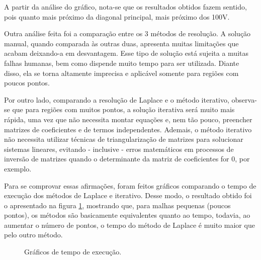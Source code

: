 \documentclass[a4paper,11pt]{article}
\begin{document}
    A partir da análise do gráfico, nota-se que os resultados obtidos fazem sentido, pois quanto mais próximo da diagonal principal, mais próximo dos 100V.
    
    Outra análise feita foi a comparação entre os 3 métodos de resolução. A solução manual, quando comparada às outras duas, apresenta muitas limitações que acabam deixando-a em desvantagem. Esse tipo de solução está sujeita a muitas falhas humanas, bem como dispende muito tempo para ser utilizada. Diante disso, ela se torna altamente imprecisa e aplicável somente para regiões com poucos pontos.
    
    Por outro lado, comparando a resolução de Laplace e o método iterativo, observa-se que para regiões com muitos pontos, a solução iterativa será muito mais rápida, uma vez que não necessita montar equações e, nem tão pouco, preencher matrizes de coeficientes e de termos independentes. Ademais, o método iterativo não necessita utilizar técnicas de triangularização de matrizes para solucionar sistemas lineares, evitando - inclusive - erros matemáticos em processos de inversão de matrizes quando o determinante da matriz de coeficientes for 0, por exemplo.
    
    Para se comprovar essas afirmações, foram feitos gráficos comparando o tempo de execução dos métodos de Laplace e iterativo. Desse modo, o resultado obtido foi o apresentado na figura \ref{tempo}, mostrando que, para malhas pequenas (poucos pontos), os métodos são basicamente equivalentes quanto ao tempo, todavia, ao aumentar o número de pontos, o tempo do método de Laplace é muito maior que pelo outro método. 
    
    \begin{figure}[H]
        \centering
        \caption[width=\columnwidth]{Gráficos de tempo de execução.}
        \label{tempo}
    \end{figure}
    
\end{document}
